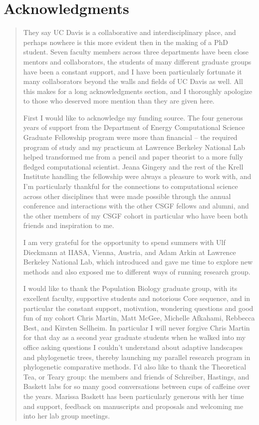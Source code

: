 

\prelimheaders

\chapter*{Acknowledgments}

\begin{quote}


They say UC Davis is a collaborative and interdisciplinary place, and perhaps nowhere is this more evident then in the making of a PhD student.  Seven faculty members across three departments have been close mentors and collaborators, the students of many different graduate groups have been a constant support, and I have been particularly fortunate it many collaborators beyond the walls and fields of UC Davis as well.  All this makes for a long acknowledgments section, and I thoroughly apologize to those who deserved more mention than they are given here. 

First I would like to acknowledge my funding source.  The four generous years of support from the Department of Energy Computational Science Graduate Fellowship program were more than financial -- the required program of study and my practicum at Lawrence Berkeley National Lab helped transformed me from a pencil and paper theorist to a more fully fledged computational scientist.  Jeana Gingery and the rest of the Krell Institute handling the fellowship were always a pleasure to work with, and I'm particularly thankful for the connections to computational science across other disciplines that were made possible through the annual conference and interactions with the other CSGF fellows and alumni, and the other members of my CSGF cohort in particular who have been both friends and inspiration to me.  

I am very grateful for the opportunity to spend summers with Ulf Dieckmann at IIASA, Vienna, Austria, and Adam Arkin at Lawrence Berkeley National Lab, which introduced and gave me time to explore new methods and also exposed me to different ways of running research group.  

I would like to thank the Population Biology graduate group, with its excellent faculty, supportive students and notorious Core sequence, and in particular the constant support, motivation, wondering questions and good fun of my cohort Chris Martin, Matt McGee, Michelle Afkahami, Rebbecca Best, and Kirsten Sellheim.  In particular I will never forgive Chris Martin for that day as a second year graduate students when he walked into my office asking questions I couldn't understand about adaptive landscapes and phylogenetic trees, thereby launching my parallel research program in phylogenetic comparative methods.  I'd also like to thank the Theoretical Tea, or Teary group: the members and friends of Schreiber, Hastings, and Baskett labs for so many good conversations between cups of caffeine over the years.  Marissa Baskett has been particularly generous with her time and support, feedback on manuscripts and proposals and welcoming me into her lab group meetings. 


\end{quote}
